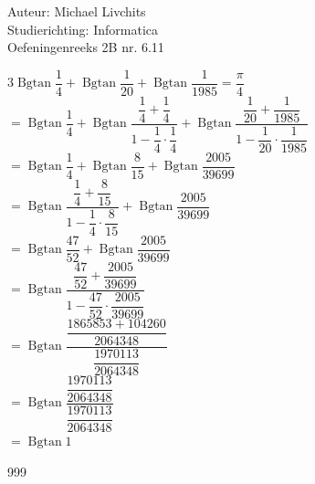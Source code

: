 \documentclass[a4paper]{article}
\newcommand{\Bgtan}{\operatorname{Bgtan}}
\begin{document}
  
\noindent \large Auteur: Michael Livchits \\
\noindent \large Studierichting: Informatica\\
\noindent \large Oefeningenreeks 2B nr. 6.11\\

\medskip

\normalsize

$3\Bgtan\dfrac{1}{4} + \Bgtan\dfrac{1}{20} + \Bgtan\dfrac{1}{1985} = \dfrac{\pi}{4}$\\

$= \Bgtan\dfrac{1}{4} +\Bgtan\dfrac{\dfrac{1}{4}+\dfrac{1}{4}}{1-\dfrac{1}{4}\cdot\dfrac{1}{4}} +\Bgtan\dfrac{\dfrac{1}{20}+\dfrac{1}{1985}}{1-\dfrac{1}{20}\cdot\dfrac{1}{1985}} $\\

$= \Bgtan\dfrac{1}{4} + \Bgtan\dfrac{8}{15} + \Bgtan\dfrac{2005}{39699}$\\

$= \Bgtan\dfrac{\dfrac{1}{4}+\dfrac{8}{15}}{1-\dfrac{1}{4}\cdot\dfrac{8}{15}} + \Bgtan\dfrac{2005}{39699}$\\

$= \Bgtan\dfrac{47}{52} + \Bgtan\dfrac{2005}{39699}$\\

$= \Bgtan\dfrac{\dfrac{47}{52}+\dfrac{2005}{39699}}{1-\dfrac{47}{52}\cdot\dfrac{2005}{39699}}$\\

$= \Bgtan\dfrac{\dfrac{1865853+104260}{2064348}}{\dfrac{1970113}{2064348}}$\\

$= \Bgtan\dfrac{\dfrac{1970113}{2064348}}{\dfrac{1970113}{2064348}}$\\

$= \Bgtan1$\\

\begin{thebibliography}{999}
\end{thebibliography}
\end{document}
